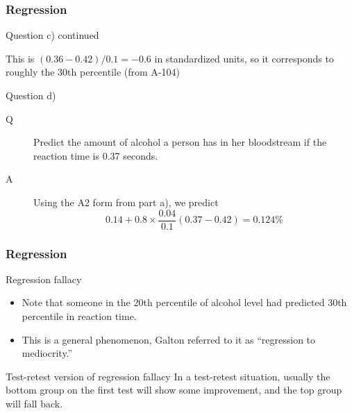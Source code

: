 \documentclass[handout]{beamer}
\begin{document}
   \begin{frame} \frametitle{Regression}

   \begin{block}
   {Question c) continued}

   This is $(0.36-0.42)/0.1=-0.6$ in standardized units, so
   it corresponds to roughly the 30th percentile (from A-104)
   \end{block}

   \begin{block}
   {Question d)}
   \begin{description}
   \item[Q]    Predict the amount of alcohol a person has in
   her bloodstream if the reaction time is 0.37 seconds.
   \item[A] Using the A2 form from part a), we predict
   $$
   0.14 + 0.8 \times \frac{0.04}{0.1} (0.37-0.42) = 0.124 \%
   $$
   \end{description}
   \end{block}
   \end{frame}


   \begin{frame} \frametitle{Regression}

   \begin{block}
   {Regression fallacy}

   \begin{itemize}
   \item    Note that someone in the 20th percentile of alcohol
   level had predicted 30th percentile in reaction time.
   \item This is a general phenomenon, Galton referred to it as
   ``regression to mediocrity.''
   \end{itemize}

   \end{block}

   \begin{block}
   {Test-retest version of regression fallacy}
   In a test-retest situation, usually the bottom
   group on the first test will show some improvement,
   and the top group will fall back.
   \end{block}
   \end{frame}

\end{document}
